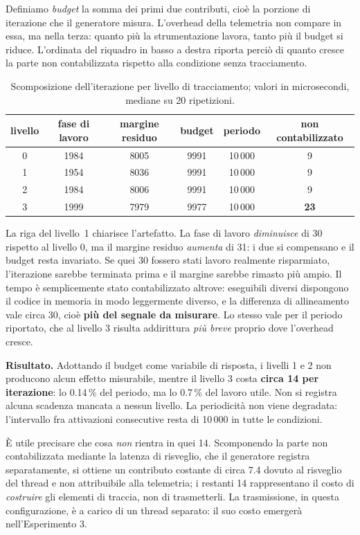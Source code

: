 Definiamo \emph{budget} la somma dei primi due contributi, cio\`e la porzione di iterazione che il
generatore misura. L'overhead della telemetria non compare in essa, ma nella terza: quanto pi\`u la
strumentazione lavora, tanto pi\`u il budget si riduce. L'ordinata del riquadro in basso a destra
riporta perci\`o di quanto cresce la parte non contabilizzata rispetto alla condizione senza
tracciamento.

\begin{table}[h]\centering\small
\begin{tabular}{cccccc}
\toprule
\textbf{livello} & fase di lavoro & margine residuo & \textbf{budget} & periodo & non contabilizzato \\
\midrule
0 & 1984 & 8005 & 9991 & 10\,000 & 9 \\
1 & 1954 & 8036 & 9991 & 10\,000 & 9 \\
2 & 1984 & 8006 & 9991 & 10\,000 & 9 \\
3 & 1999 & 7979 & 9977 & 10\,000 & \textbf{23} \\
\bottomrule
\end{tabular}
\caption{Scomposizione dell'iterazione per livello di tracciamento; valori in microsecondi,
mediane su 20 ripetizioni.}
\label{tab:anatomia}
\end{table}

La riga del livello~1 chiarisce l'artefatto. La fase di lavoro \emph{diminuisce} di 30\us{} rispetto
al livello 0, ma il margine residuo \emph{aumenta} di 31: i due si compensano e il budget resta
invariato. Se quei 30\us{} fossero stati lavoro realmente risparmiato, l'iterazione sarebbe
terminata prima e il margine sarebbe rimasto pi\`u ampio. Il tempo \`e semplicemente stato
contabilizzato altrove: eseguibili diversi dispongono il codice in memoria in modo leggermente
diverso, e la differenza di allineamento vale circa 30\us, cio\`e \textbf{pi\`u del segnale da
misurare}. Lo stesso vale per il periodo riportato, che al livello 3 risulta addirittura
\emph{pi\`u breve} proprio dove l'overhead cresce.

\textbf{Risultato.} Adottando il budget come variabile di risposta, i livelli 1 e 2 non producono
alcun effetto misurabile, mentre il livello 3 costa \textbf{circa 14\us{} per iterazione}: lo
0.14\,\% del periodo, ma lo 0.7\,\% del lavoro utile. Non si registra alcuna scadenza mancata a
nessun livello. La periodicit\`a non viene degradata: l'intervallo fra attivazioni consecutive resta
di 10\,000\us{} in tutte le condizioni.

\`E utile precisare che cosa \emph{non} rientra in quei 14\us. Scomponendo la parte non
contabilizzata mediante la latenza di risveglio, che il generatore registra separatamente, si
ottiene un contributo costante di circa 7.4\us{} dovuto al risveglio del thread e non attribuibile
alla telemetria; i restanti 14\us{} rappresentano il costo di \emph{costruire} gli elementi di
traccia, non di trasmetterli. La trasmissione, in questa configurazione, \`e a carico di un thread
separato: il suo costo emerger\`a nell'Esperimento 3.

